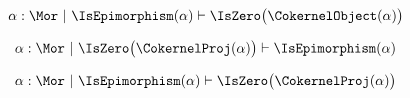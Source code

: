 \begin{sequent}
\begin{align*}
  \alpha: \Mor ~|~ \IsEpimorphism( \alpha ) \vdash \IsZero\big( \CokernelObject( \alpha ) \big)
\end{align*}
\end{sequent}

\begin{sequent}
\begin{align*}
  \alpha: \Mor ~|~ \IsZero\big( \CokernelProj( \alpha ) \big) \vdash \IsEpimorphism( \alpha )
\end{align*}
\end{sequent}

\begin{sequent}
\begin{align*}
  \alpha: \Mor ~|~  \IsEpimorphism( \alpha ) \vdash \IsZero\big( \CokernelProj( \alpha ) \big)
\end{align*}
\end{sequent}
